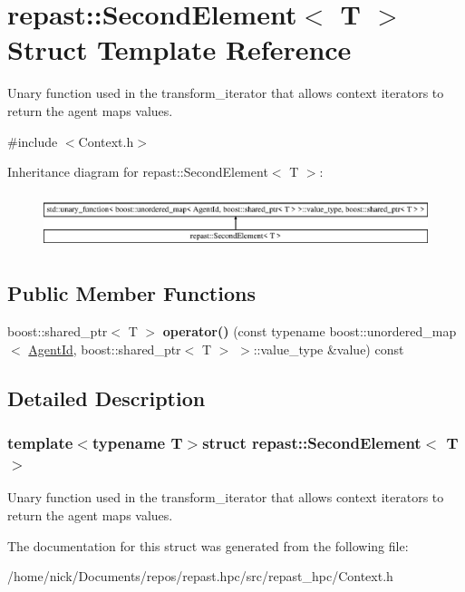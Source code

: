\hypertarget{structrepast_1_1_second_element}{\section{repast\-:\-:Second\-Element$<$ T $>$ Struct Template Reference}
\label{structrepast_1_1_second_element}
}


Unary function used in the transform\-\_\-iterator that allows context iterators to return the agent maps values.  




{\ttfamily \#include $<$Context.\-h$>$}

Inheritance diagram for repast\-:\-:Second\-Element$<$ T $>$\-:\begin{figure}[H]
\begin{center}
\leavevmode
\includegraphics[height=1.635036cm]{structrepast_1_1_second_element}
\end{center}
\end{figure}
\subsection*{Public Member Functions}
\begin{DoxyCompactItemize}
\item 
\hypertarget{structrepast_1_1_second_element_abb240a7a393d6a8ed72b365159579e15}{boost\-::shared\-\_\-ptr$<$ T $>$ {\bfseries operator()} (const typename boost\-::unordered\-\_\-map$<$ \hyperlink{classrepast_1_1_agent_id}{Agent\-Id}, boost\-::shared\-\_\-ptr$<$ T $>$ $>$\-::value\-\_\-type \&value) const }\label{structrepast_1_1_second_element_abb240a7a393d6a8ed72b365159579e15}

\end{DoxyCompactItemize}


\subsection{Detailed Description}
\subsubsection*{template$<$typename T$>$struct repast\-::\-Second\-Element$<$ T $>$}

Unary function used in the transform\-\_\-iterator that allows context iterators to return the agent maps values. 

The documentation for this struct was generated from the following file\-:\begin{DoxyCompactItemize}
\item 
/home/nick/\-Documents/repos/repast.\-hpc/src/repast\-\_\-hpc/Context.\-h\end{DoxyCompactItemize}
